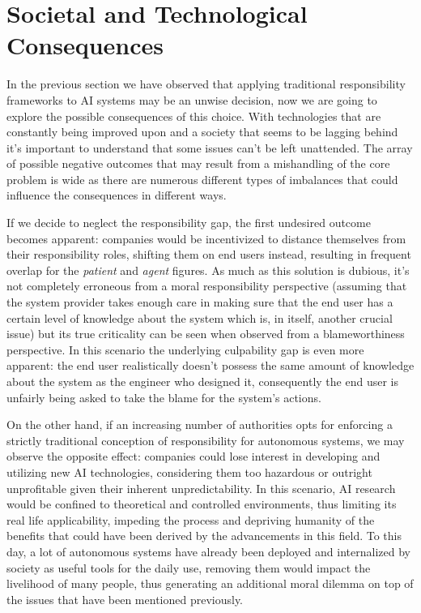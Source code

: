 \section{Societal and Technological Consequences}\label{sec:consequences}

In the previous section we have observed that applying traditional responsibility frameworks to AI systems may be an unwise decision, now we are going to explore the possible consequences of this choice.
With technologies that are constantly being improved upon and a society that seems to be lagging behind it's important to understand that some issues can't be left unattended.
The array of possible negative outcomes that may result from a mishandling of the core problem is wide as there are numerous different types of imbalances that could influence the consequences in different ways.

If we decide to neglect the responsibility gap, the first undesired outcome becomes apparent: companies would be incentivized to distance themselves from their responsibility roles, shifting them on end users instead, resulting in frequent overlap for the \textit{patient} and \textit{agent} figures.
As much as this solution is dubious, it's not completely erroneous from a moral responsibility perspective (assuming that the system provider takes enough care in making sure that the end user has a certain level of knowledge about the system which is, in itself, another crucial issue) but its true criticality can be seen when observed from a blameworthiness perspective.
In this scenario the underlying culpability gap \parencite{SANFRG} is even more apparent: the end user realistically doesn't possess the same amount of knowledge about the system as the engineer who designed it, consequently the end user is unfairly being asked to take the blame for the system's actions.

On the other hand, if an increasing number of authorities opts for enforcing a strictly traditional conception of responsibility for autonomous systems, we may observe the opposite effect: companies could lose interest in developing and utilizing new AI technologies, considering them too hazardous or outright unprofitable given their inherent unpredictability.
In this scenario, AI research would be confined to theoretical and controlled environments, thus limiting its real life applicability, impeding the process and depriving humanity of the benefits that could have been derived by the advancements in this field.
To this day, a lot of autonomous systems have already been deployed and internalized by society as useful tools for the daily use, removing them would impact the livelihood of many people, thus generating an additional moral dilemma on top of the issues that have been mentioned previously.